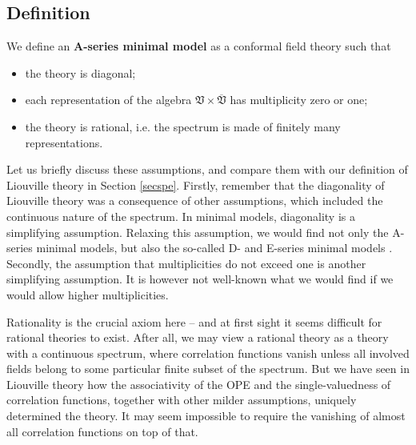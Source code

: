 \documentclass[12pt, a4paper, notitlepage, twoside]{report}
\numberwithin{equation}{section}
\theoremstyle{break}
\begin{document}
\subsection{Definition}

We define an \textbf{A-series minimal model} as a conformal field theory such that
\begin{itemize}
 \item the theory is diagonal;
\item each representation of the algebra $\mathfrak{V}\times \overline{\mathfrak{V}}$ has multiplicity zero or one;
\item the theory is rational, i.e.
the spectrum is made of finitely many representations.
\end{itemize}
Let us briefly discuss these assumptions, and compare them with our definition of Liouville theory in Section \ref{secspe}.
Firstly, remember that the diagonality of Liouville theory was a consequence of other assumptions, which included the continuous nature of the spectrum.
In minimal models, diagonality is a simplifying assumption.
Relaxing this assumption, we would find not only the A-series minimal models, but also the so-called D- and E-series minimal models \cite{fms97}.
Secondly, the assumption that multiplicities do not exceed one is another simplifying assumption.
It is however not well-known what we would find if we would allow higher multiplicities. 

Rationality is the crucial axiom here -- and at first sight it seems difficult for rational theories to exist.
After all, we may view a rational theory as a theory with a continuous spectrum, where correlation functions vanish unless all involved fields belong to some particular finite subset of the spectrum.
But we have seen in Liouville theory how the associativity of the OPE and the single-valuedness of correlation functions, together with other milder assumptions, uniquely determined the theory.
It may seem impossible to require the vanishing of almost all correlation functions on top of that. 
\end{document}

